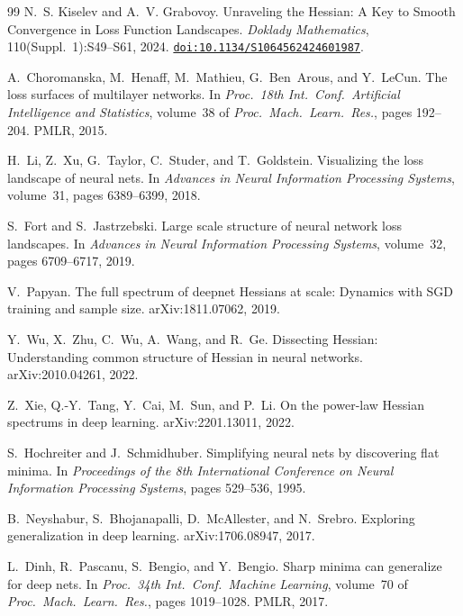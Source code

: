 \documentclass[10pt,letterpaper]{article}
\theoremstyle{definition}
\begin{document}
\begin{thebibliography}{99}
N.~S. Kiselev and A.~V. Grabovoy.
\newblock Unraveling the {H}essian: {A} Key to Smooth Convergence in Loss Function Landscapes.
\newblock \emph{Doklady Mathematics}, 110(Suppl.~1):S49--S61, 2024.
\newblock \href{https://doi.org/10.1134/S1064562424601987}{\texttt{doi:10.1134/S1064562424601987}}.

A.~Choromanska, M.~Henaff, M.~Mathieu, G.~Ben~Arous, and Y.~LeCun.
\newblock The loss surfaces of multilayer networks.
\newblock In \emph{Proc.\ 18th Int.\ Conf.\ Artificial Intelligence and Statistics}, volume~38 of \emph{Proc.\ Mach.\ Learn.\ Res.}, pages 192--204. PMLR, 2015.

H.~Li, Z.~Xu, G.~Taylor, C.~Studer, and T.~Goldstein.
\newblock Visualizing the loss landscape of neural nets.
\newblock In \emph{Advances in Neural Information Processing Systems}, volume~31, pages 6389--6399, 2018.

S.~Fort and S.~Jastrzebski.
\newblock Large scale structure of neural network loss landscapes.
\newblock In \emph{Advances in Neural Information Processing Systems}, volume~32, pages 6709--6717, 2019.

V.~Papyan.
\newblock The full spectrum of deepnet Hessians at scale: Dynamics with SGD training and sample size.
\newblock arXiv:1811.07062, 2019.

Y.~Wu, X.~Zhu, C.~Wu, A.~Wang, and R.~Ge.
\newblock Dissecting Hessian: Understanding common structure of Hessian in neural networks.
\newblock arXiv:2010.04261, 2022.

Z.~Xie, Q.-Y.~Tang, Y.~Cai, M.~Sun, and P.~Li.
\newblock On the power-law Hessian spectrums in deep learning.
\newblock arXiv:2201.13011, 2022.

S.~Hochreiter and J.~Schmidhuber.
\newblock Simplifying neural nets by discovering flat minima.
\newblock In \emph{Proceedings of the 8th International Conference on Neural Information Processing Systems}, pages 529--536, 1995.

B.~Neyshabur, S.~Bhojanapalli, D.~McAllester, and N.~Srebro.
\newblock Exploring generalization in deep learning.
\newblock arXiv:1706.08947, 2017.

L.~Dinh, R.~Pascanu, S.~Bengio, and Y.~Bengio.
\newblock Sharp minima can generalize for deep nets.
\newblock In \emph{Proc.\ 34th Int.\ Conf.\ Machine Learning}, volume~70 of \emph{Proc.\ Mach.\ Learn.\ Res.}, pages 1019--1028. PMLR, 2017.


\end{thebibliography}
\end{document}
